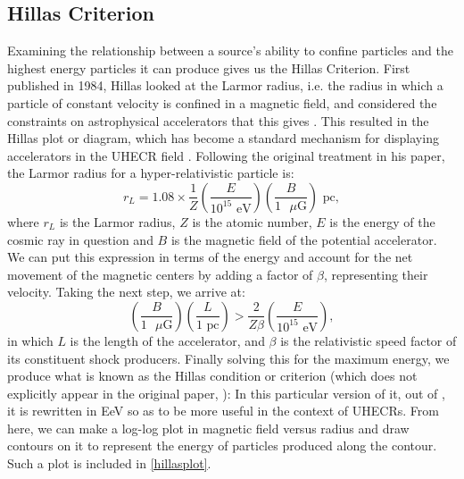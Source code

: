 \subsection{Hillas Criterion}
\label{hillas}
Examining the relationship between a source's ability to confine particles and the highest energy particles it can produce gives us the Hillas Criterion. First published in 1984, Hillas looked at the Larmor radius, i.e. the radius in which a particle of constant velocity is confined in a magnetic field, and considered the constraints on astrophysical accelerators that this gives \cite{hillas}. This resulted in the Hillas plot or diagram, which has become a standard mechanism for displaying accelerators in the UHECR field \cite{stanev}. Following the original treatment in his paper, the Larmor radius for a hyper-relativistic particle is:
$$ r_L=1.08\times\frac{1}{Z}\left(\frac{E}{10^{15}\mbox{ eV}}\right)\left(\frac{B}{1\mbox{ $\mu$G}}\right)\mbox{ pc}, $$
where $r_L$ is the Larmor radius, $Z$ is the atomic number, $E$ is the energy of the cosmic ray in question and $B$ is the magnetic field of the potential accelerator. We can put this expression in terms of the energy and account for the net movement of the magnetic centers by adding a factor of $\beta$, representing their velocity. Taking the next step, we arrive at:
$$\left(\frac{B}{1\mbox{ $\mu$G}}\right) \left(\frac{L}{1\mbox{ pc}}\right)>\frac{2}{Z \beta}\left(\frac{E}{10^{15}\mbox{ eV}}\right),$$
in which $L$ is the length of the accelerator, and $\beta$ is the relativistic speed factor of its constituent shock producers. Finally solving this for the maximum energy, we produce what is known as the Hillas condition or criterion (which does not explicitly appear in the original paper, \cite{hillas}):
In this particular version of it, out of \cite{stanev}, it is rewritten in EeV so as to be more useful in the context of UHECRs. From here, we can make a log-log plot in magnetic field versus radius and draw contours on it to represent the energy of particles produced along the contour. Such a plot is included in \autoref{hillasplot}.

